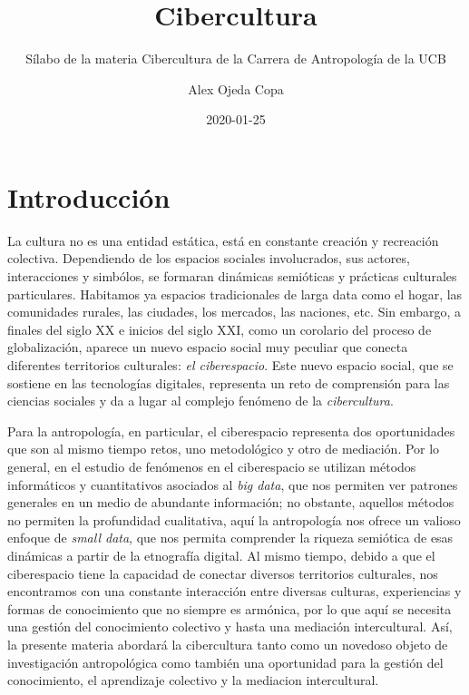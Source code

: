 \documentclass[]{book}
\title{Cibercultura}
\subtitle{Sílabo de la materia Cibercultura de la Carrera de Antropología de la UCB}
\author{Alex Ojeda Copa}
\date{2020-01-25}
\begin{document}
\maketitle

{
\setcounter{tocdepth}{1}
\tableofcontents
}
\hypertarget{introducciuxf3n}{%
\chapter*{Introducción}\label{introducciuxf3n}}

La cultura no es una entidad estática, está en constante creación y recreación colectiva. Dependiendo de los espacios sociales involucrados, sus actores, interacciones y simbólos, se formaran dinámicas semióticas y prácticas culturales particulares. Habitamos ya espacios tradicionales de larga data como el hogar, las comunidades rurales, las ciudades, los mercados, las naciones, etc. Sin embargo, a finales del siglo XX e inicios del siglo XXI, como un corolario del proceso de globalización, aparece un nuevo espacio social muy peculiar que conecta diferentes territorios culturales: \emph{el ciberespacio}. Este nuevo espacio social, que se sostiene en las tecnologías digitales, representa un reto de comprensión para las ciencias sociales y da a lugar al complejo fenómeno de la \emph{cibercultura}.

Para la antropología, en particular, el ciberespacio representa dos oportunidades que son al mismo tiempo retos, uno metodológico y otro de mediación. Por lo general, en el estudio de fenómenos en el ciberespacio se utilizan métodos informáticos y cuantitativos asociados al \emph{big data}, que nos permiten ver patrones generales en un medio de abundante información; no obstante, aquellos métodos no permiten la profundidad cualitativa, aquí la antropología nos ofrece un valioso enfoque de \emph{small data}, que nos permita comprender la riqueza semiótica de esas dinámicas a partir de la etnografía digital. Al mismo tiempo, debido a que el ciberespacio tiene la capacidad de conectar diversos territorios culturales, nos encontramos con una constante interacción entre diversas culturas, experiencias y formas de conocimiento que no siempre es armónica, por lo que aquí se necesita una gestión del conocimiento colectivo y hasta una mediación intercultural. Así, la presente materia abordará la cibercultura tanto como un novedoso objeto de investigación antropológica como también una oportunidad para la gestión del conocimiento, el aprendizaje colectivo y la mediacion intercultural.
\end{document}
